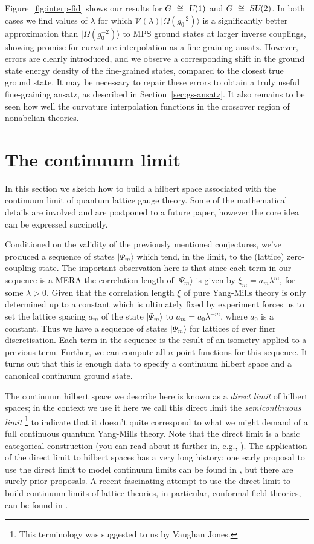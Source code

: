 \documentclass[twocolumn,lengthcheck,superscriptaddress]{revtex4-1}
\def\su2{\textsl{SU}(2)}
\def\uone{\textsl{U}(1)}
\theoremstyle{definition}
\theoremstyle{remark}
\begin{document}
Figure~\ref{fig:interp-fid} shows our results for $G~\cong~\uone$ and $G~\cong~\su2$. In both cases we find values of $\lambda$ for which $\mathcal{V}(\lambda)|\Omega(g_0^{-2})\rangle$ is a significantly better approximation than $|\Omega(g_0^{-2})\rangle$ to MPS ground states at larger inverse couplings, showing promise for curvature interpolation as a fine-graining ansatz. However, errors are clearly introduced, and we observe a corresponding shift in the ground state energy density of the fine-grained states, compared to the closest true ground state. It may be necessary to repair these errors to obtain a truly useful fine-graining ansatz, as described in Section~\ref{sec:gs-ansatz}. It also remains to be seen how well the curvature interpolation functions in the crossover region of nonabelian theories.

\section{The continuum limit}
In this section we sketch how to build a hilbert space associated with the continuum limit of quantum lattice gauge theory. Some of the mathematical details are involved and are postponed to a future paper, however the core idea can be expressed succinctly. 

Conditioned on the validity of the previously mentioned conjectures, we've produced a sequence of states $|\Psi_m\rangle$ which tend, in the limit, to the (lattice) zero-coupling state. The important observation here is that since each term in our sequence is a MERA the correlation length of $|\Psi_m\rangle$ is given by $\xi_m = a_m\lambda^m$, for some $\lambda>0$.  Given that the correlation length $\xi$ of pure Yang-Mills theory is only determined up to a constant which is ultimately fixed by experiment forces us to set the lattice spacing $a_m$ of the state $|\Psi_m\rangle$ to $a_m = a_0\lambda^{-m}$, where $a_0$ is a constant. Thus we have a sequence of states $|\Psi_m\rangle$ for lattices of ever finer discretisation. Each term in the sequence is the result of an isometry applied to a previous term. Further, we can compute all $n$-point functions for this sequence. It turns out that this is enough data to specify a continuum hilbert space and a canonical continuum ground state. 

The continuum hilbert space we describe here is known as a \emph{direct limit} of hilbert spaces; in the context we use it here we call this direct limit the \emph{semicontinuous limit} \footnote{This terminology was suggested to us by Vaughan Jones.} to indicate that it doesn't quite correspond to what we might demand of a full continuous quantum Yang-Mills theory. Note that the direct limit is a basic categorical construction (you can read about it further in, e.g., \cite{lang:2002a}). The application of the direct limit to hilbert spaces has a very long history; one early proposal to use the direct limit to model continuum limits can be found in \cite{bimonte_lattices_1996}, but there are surely prior proposals. A recent fascinating attempt to use the direct limit to build continuum limits of lattice theories, in particular, conformal field theories, can be found in \cite{jones_unitary_2014}.
\end{document}

